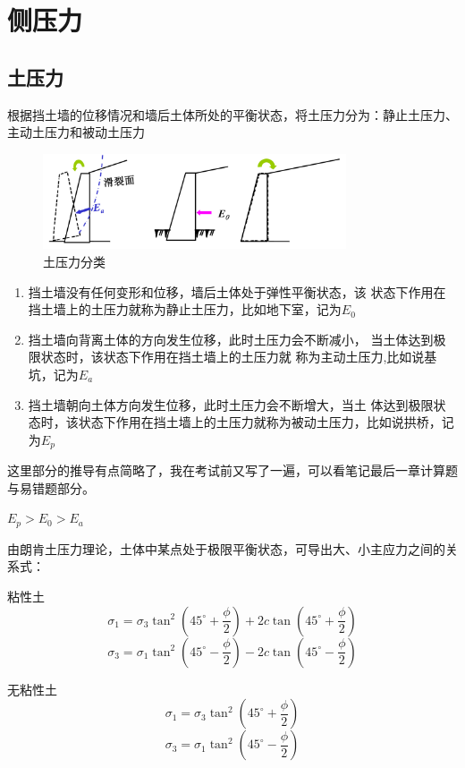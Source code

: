 \documentclass[12pt, a4paper, oneside, UTF8]{ctexbook}
\begin{document}
% 
\else
\fi

\chapter{侧压力}

\section{土压力}
\begin{definition}
    根据挡土墙的位移情况和墙后土体所处的平衡状态，将土压力分为：静止土压力、主动土压力和被动土压力
\end{definition}

\begin{figure}[H]
    \centering
    \includegraphics[width=0.8\textwidth]{../figure/dangtuqiang.png}
    \caption{土压力分类}
\end{figure}

\begin{enumerate}
    \item 挡土墙{\color{red}没有任何变形和位移}，墙后土体处于{\color{red}弹性平衡状态}，该
    状态下作用在挡土墙上的土压力就称为静止土压力，比如地下室，记为$E_0$
    \item 挡土墙{\color{red}向背离土体的方向发生位移}，此时土压力会不断减小，
当土体达到极限状态时，该状态下作用在挡土墙上的土压力就
称为主动土压力,比如说基坑，记为$E_a$
    \item 挡土墙朝{\color{red}向土体方向发生位移}，此时土压力会不断增大，当土
    体达到极限状态时，该状态下作用在挡土墙上的土压力就称为被动土压力，比如说拱桥，记为$E_p$
\end{enumerate}

{\color{red}这里部分的推导有点简略了，我在考试前又写了一遍，可以看笔记最后一章计算题与易错题部分。}

\begin{remark}
    $
    E_p>E_0>E_a
    $
\end{remark}

\begin{definition}
    由朗肯土压力理论，土体中某点处于极限平衡状态，可导出大、小主应力之间的关系式：

粘性土
$$
\sigma_1 = \sigma_3 \tan^2 \left( 45^\circ + \frac{\phi}{2} \right) + 2c \tan \left( 45^\circ + \frac{\phi}{2} \right)
$$
$$
\sigma_3 = \sigma_1 \tan^2 \left( 45^\circ - \frac{\phi}{2} \right) - 2c \tan \left( 45^\circ - \frac{\phi}{2} \right)
$$

无粘性土
$$
\sigma_1 = \sigma_3 \tan^2 \left( 45^\circ + \frac{\phi}{2} \right)
$$
$$
\sigma_3 = \sigma_1 \tan^2 \left( 45^\circ - \frac{\phi}{2} \right)
$$
\end{definition}
\end{document}

